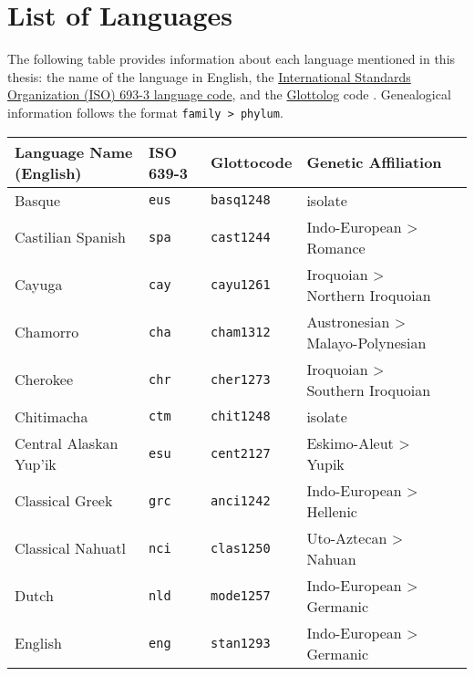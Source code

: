 \chapter*{List of Languages}
\label{ch:languages}

The following table provides information about each language mentioned in this thesis: the name of the language in English, the \href{https://iso639-3.sil.org/}{International Standards Organization (ISO) 693-3 language code}, and the \href{https://glottolog.org/}{Glottolog} code \parencite{HammarstromForkelHaspelmath2019}. Genealogical information follows the format \texttt{family > phylum}.

\renewcommand{\arraystretch}{1}

\begin{longtable}[h]{ l l l l l }
  \onehalfspacing
  \textbf{Language Name (English)} & \textbf{ISO 639-3} & \textbf{Glottocode} & \textbf{Genetic Affiliation}\\
  \midrule
  Basque                           & \texttt{eus}       & \texttt{basq1248}   & isolate\\
  Castilian Spanish                & \texttt{spa}       & \texttt{cast1244}   & Indo-European > Romance\\
  Cayuga                           & \texttt{cay}       & \texttt{cayu1261}   & Iroquoian > Northern Iroquoian\\
  Chamorro                         & \texttt{cha}       & \texttt{cham1312}   & Austronesian > Malayo-Polynesian\\
  Cherokee                         & \texttt{chr}       & \texttt{cher1273}   & Iroquoian > Southern Iroquoian\\
  Chitimacha                       & \texttt{ctm}       & \texttt{chit1248}   & isolate\\
  Central Alaskan Yup'ik           & \texttt{esu}       & \texttt{cent2127}   & Eskimo-Aleut > Yupik\\
  Classical Greek                  & \texttt{grc}       & \texttt{anci1242}   & Indo-European > Hellenic\\
  Classical Nahuatl                & \texttt{nci}       & \texttt{clas1250}   & Uto-Aztecan > Nahuan\\
  Dutch                            & \texttt{nld}       & \texttt{mode1257}   & Indo-European > Germanic\\
  English                          & \texttt{eng}       & \texttt{stan1293}   & Indo-European > Germanic\\

\end{longtable}
